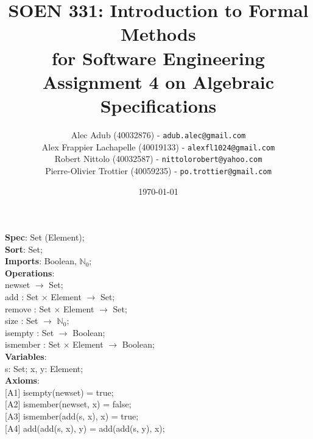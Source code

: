\documentclass[12pt]{article}
\title{SOEN 331: Introduction to Formal Methods\\for Software Engineering\\
Assignment 4 on Algebraic Specifications}
\author{\begin{tabular}{c}
Alec Adub (40032876) - \texttt{adub.alec@gmail.com} \tabularnewline
Alex Frappier Lachapelle (40019133) - \texttt{alexfl1024@gmail.com} \tabularnewline
Robert Nittolo (40032587) - \texttt{nittolorobert@yahoo.com} \tabularnewline
Pierre-Olivier Trottier (40059235) - \texttt{po.trottier@gmail.com} \tabularnewline\\
\end{tabular}}
\date{\today}
\begin{document}
\begin{spacing}{1.5}

\maketitle

\newpage

\noindent \textbf{Spec}: Set (Element);\\
\noindent \textbf{Sort}: Set;\\
\noindent \textbf{Imports}: Boolean, $\mathbb{N}_0$;\\
\noindent \textbf{Operations}:\\
\hspace*{5mm} newset $\rightarrow$ Set;\\
\hspace*{5mm} add : Set $\times$ Element $\rightarrow$ Set;\\
\hspace*{5mm} remove : Set $\times$ Element $\rightarrow$ Set;\\
\hspace*{5mm} size : Set $\rightarrow$ $\mathbb{N}_0$;\\
\hspace*{5mm} isempty : Set $\rightarrow$ Boolean;\\
\hspace*{5mm} ismember : Set $\times$ Element $\rightarrow$ Boolean;\\
\noindent \textbf{Variables}:\\
\hspace*{5mm} s: Set; x, y: Element;\\
\noindent \textbf{Axioms}:\\
\hspace*{5mm} [A1] isempty(newset) = true;\\
\hspace*{5mm} [A2] ismember(newset, x) = false;\\
\hspace*{5mm} [A3] ismember(add(s, x), x) = true;\\
\hspace*{5mm} [A4] add(add(s, x), y) = add(add(s, y), x);\\



\end{spacing}
\end{document}
